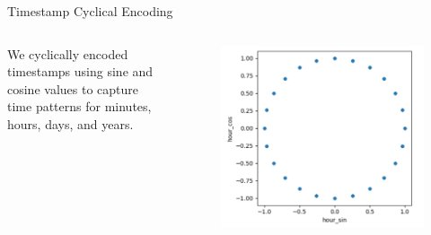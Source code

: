 \begin{frame}{Timestamp Cyclical Encoding}
\begin{columns}
    We cyclically encoded timestamps using sine and cosine values to capture time patterns for minutes, hours, days, and years.
    \begin{figure}
        \centering
        \includegraphics[width=\textwidth]{sections/2_preprocessing/imgs/tscyclic.png}
    \end{figure}
\end{columns}
\end{frame}